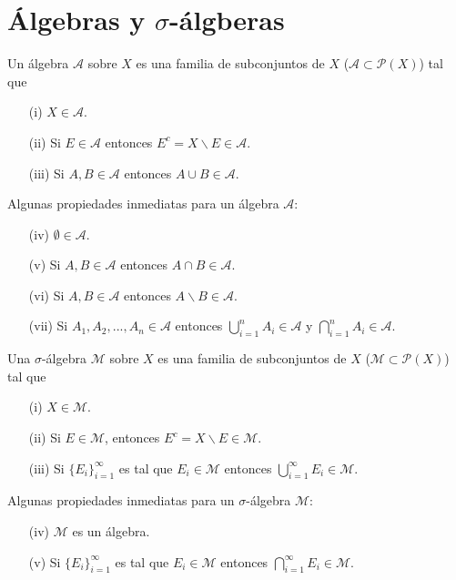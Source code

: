 \section{Álgebras y $\sigma$-álgberas}
\begin{defi}
Un álgebra $\mathcal{A}$ sobre $X$ es una familia de subconjuntos de $X$ ($\mathcal{A} \subset \mathcal{P}(X)$) tal que
\begin{enumerate}
    \item[(i)] $X \in \mathcal{A}$.
    \item[(ii)] Si $E \in \mathcal{A}$ entonces $E^c = X \backslash E \in \mathcal{A}$.
    \item[(iii)] Si $A, B \in \mathcal{A}$ entonces $A \cup B \in \mathcal{A}$.
\end{enumerate}
\end{defi}
Algunas propiedades inmediatas para un álgebra $\mathcal{A}$:
\begin{enumerate}
    \item[(iv)] $\emptyset \in \mathcal{A}$.
    \item[(v)] Si $A, B \in \mathcal{A}$ entonces $A \cap B \in \mathcal{A}$.
    \item[(vi)] Si $A, B \in \mathcal{A}$ entonces $A \backslash B \in \mathcal{A}$.
    \item[(vii)] Si $A_1, A_2,..., A_n \in \mathcal{A}$ entonces $\bigcup_{i=1}^{n}{A_i} \in \mathcal{A}$ y $\bigcap_{i=1}^{n}{A_i} \in \mathcal{A}$.
\end{enumerate}
\begin{defi}
Una $\sigma$-álgebra $\mathcal{M}$ sobre $X$ es una familia de subconjuntos de $X$ ($\mathcal{M} \subset \mathcal{P}(X)$) tal que
\begin{enumerate}
    \item[(i)] $X \in \mathcal{M}$.
    \item[(ii)] Si $E \in \mathcal{M}$, entonces $E^c = X \backslash E \in \mathcal{M}$.
    \item[(iii)] Si $\{E_i\}_{i=1}^{\infty}$ es tal que $E_i \in \mathcal{M}$ entonces $\bigcup_{i=1}^{\infty}{E_i} \in \mathcal{M}$.
\end{enumerate}
\end{defi}
Algunas propiedades inmediatas para un $\sigma$-álgebra $\mathcal{M}$:
\begin{enumerate}
    \item[(iv)] $\mathcal{M}$ es un álgebra.
    \item[(v)] Si $\{E_i\}_{i=1}^{\infty}$ es tal que $E_i \in \mathcal{M}$ entonces $\bigcap_{i=1}^{\infty}{E_i} \in \mathcal{M}$.
\end{enumerate}
